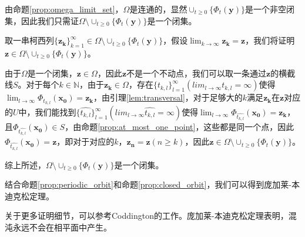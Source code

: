\begin{pf}
    由命题\ref{prop:omega_limit_set}，$\Omega$是连通的，显然$\cup_{t\geq 0}\{\Phi_t(\mathbf{y})\}$是一个非空闭集，因此我们只需证$\Omega\setminus\cup_{t\geq 0}\{\Phi_t(\mathbf{y})\}$是一个闭集。

    取一串柯西列$\{\mathbf{z_k}\}_{k=1}^{\infty}\in \Omega\setminus\cup_{t\geq 0}\{\Phi_t(\mathbf{y})\}$，假设$\lim_{k\to\infty}\mathbf{z_k}=\mathbf{z}$，我们将证明$\mathbf{z}\in \Omega\setminus\cup_{t\geq 0}\{\Phi_t(\mathbf{y})\}$。

    由于$\Omega$是一个闭集，$\mathbf{z}\in \Omega$，因此$\mathbf{z}$不是一个不动点，我们可以取一条通过$\mathbf{z}$的横截线$S$。对于每个$k\in\mathbb{N}$，由于$\mathbf{z_k}\in\Omega$，存在$\{t_{k,l}\}_{l=1}^{\infty}(lim_{l\to\infty}t_{k,l}=\infty)$使得$\lim_{l\to\infty}\Phi_{t_{k,l}}(\mathbf{x_0})=\mathbf{z_k}$，由引理\ref{lem:transversal}，对于足够大的$k$满足$\mathbf{z_k}$在$\mathbf{z}$对应的$U$中，我们能找到$\{\hat{t_{k,l}}\}_{l=1}^{\infty}(lim_{l\to\infty}\hat{t_{k,l}}=\infty)$使得$\lim_{l\to\infty}\Phi_{\hat{t_{k,l}}}(\mathbf{x_0})=\mathbf{z_k}$，且$\Phi_{\hat{t_{k,l}}}(\mathbf{x_0})\in S$，由命题\ref{prop:at_most_one_point}，这些都是同一个点，因此$\Phi_{\hat{t_{k,l}}}(\mathbf{x_0})=\mathbf{z}$，即对于对应的$k$，$\mathbf{z_n}=\mathbf{z}(n\geq k)$，因此$\mathbf{z}\in \Omega\setminus\cup_{t\geq 0}\{\Phi_t(\mathbf{y})\}$。

    综上所述，$\Omega\setminus\cup_{t\geq 0}\{\Phi_t(\mathbf{y})\}$是一个闭集。
\end{pf}
结合命题\ref{prop:periodic_orbit}和命题\ref{prop:closed_orbit}，我们可以得到庞加莱-本迪克松定理。

关于更多证明细节，可以参考Coddington的工作\cite{coddington1956theory}。庞加莱-本迪克松定理表明，混沌永远不会在相平面中产生\cite{strogatz2018nonlinear}。
